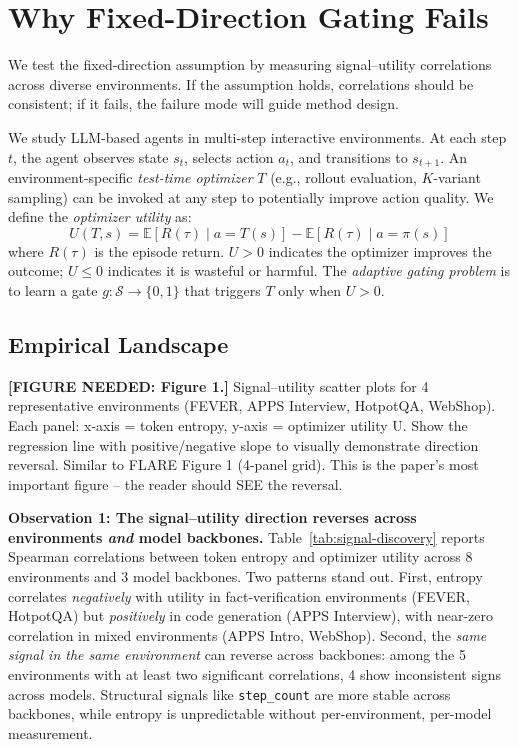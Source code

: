 \section{Why Fixed-Direction Gating Fails}
\label{sec:signal-landscape}

We test the fixed-direction assumption by measuring signal--utility
correlations across diverse environments. If the assumption holds,
correlations should be consistent; if it fails, the failure mode will
guide method design.

We study LLM-based agents in multi-step interactive environments.
At each step $t$, the agent observes state $s_t$, selects action
$a_t$, and transitions to $s_{t+1}$. An environment-specific
\emph{test-time optimizer} $T$ (e.g., rollout evaluation, $K$-variant
sampling) can be invoked at any step to potentially improve action
quality. We define the \emph{optimizer utility} as:
\begin{equation}
  U(T, s) = \mathbb{E}[R(\tau) \mid a{=}T(s)]
           - \mathbb{E}[R(\tau) \mid a{=}\pi(s)]
  \label{eq:utility}
\end{equation}
where $R(\tau)$ is the episode return. $U > 0$ indicates the optimizer
improves the outcome; $U \leq 0$ indicates it is wasteful or harmful.
The \emph{adaptive gating problem} is to learn a gate
$g: \mathcal{S} \to \{0, 1\}$ that triggers $T$ only when $U > 0$.

\subsection{Empirical Landscape}
\label{sec:empirical-landscape}

{\color{red} \textbf{[FIGURE NEEDED: Figure 1.]} Signal--utility scatter plots
for 4 representative environments (FEVER, APPS Interview, HotpotQA, WebShop).
Each panel: x-axis = token entropy, y-axis = optimizer utility U.
Show the regression line with positive/negative slope to visually
demonstrate direction reversal. Similar to FLARE Figure 1 (4-panel grid).
This is the paper's most important figure -- the reader should SEE the reversal.}

\textbf{Observation 1: The signal--utility direction reverses across
environments \emph{and} model backbones.}
Table~\ref{tab:signal-discovery} reports Spearman correlations between
token entropy and optimizer utility across 8 environments and 3 model
backbones. Two patterns stand out. First, entropy correlates
\emph{negatively} with utility in fact-verification environments
(FEVER, HotpotQA) but \emph{positively} in code generation (APPS
Interview), with near-zero correlation in mixed environments (APPS
Intro, WebShop). Second, the \emph{same signal in the same
environment} can reverse across backbones: among the 5 environments
with at least two significant correlations, 4 show inconsistent
signs across models. Structural signals like \texttt{step\_count}
are more stable across backbones, while entropy is unpredictable
without per-environment, per-model measurement.

